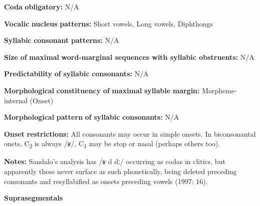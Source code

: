 \documentclass[output=paper]{langsci/langscibook}
\begin{document}
\begin{styleBody}
\textbf{Coda} \textbf{obligatory:} N/A
\end{styleBody}

\begin{styleBody}
\textbf{Vocalic} \textbf{nucleus} \textbf{patterns:} Short vowels, Long vowels, Diphthongs
\end{styleBody}

\begin{styleBody}
\textbf{Syllabic} \textbf{consonant} \textbf{patterns:} N/A
\end{styleBody}

\begin{styleBody}
\textbf{Size} \textbf{of} \textbf{maximal} \textbf{word{}-marginal sequences with syllabic obstruents:} N/A
\end{styleBody}

\begin{styleBody}
\textbf{Predictability} \textbf{of} \textbf{syllabic} \textbf{consonants:} N/A
\end{styleBody}

\begin{styleBody}
\textbf{Morphological} \textbf{constituency} \textbf{of} \textbf{maximal} \textbf{syllable} \textbf{margin:} Morpheme-internal (Onset)
\end{styleBody}

\begin{styleBody}
\textbf{Morphological} \textbf{pattern} \textbf{of} \textbf{syllabic} \textbf{consonants:} N/A
\end{styleBody}

\begin{styleBody}
\textbf{Onset} \textbf{restrictions:} All consonants may occur in simple onsets. In biconsonantal onets, C\textsubscript{2} is always /ʁ/, C\textsubscript{1} may be stop or nasal (perhaps others too).
\end{styleBody}

\begin{styleBody}
\textbf{Notes:} Sandalo’s analysis has /ʁ d dː/ occurring as codas in clitics, but apparently these never surface as such phonetically, being deleted preceding consonants and resyllabified as onsets preceding vowels (1997: 16).
\end{styleBody}

\begin{styleBody}
\textbf{Suprasegmentals}
\end{styleBody}
\end{document}
